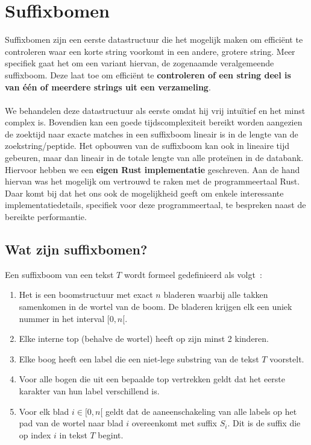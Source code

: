 \chapter{Suffixbomen}\label{ch:suffix-bomen}
Suffixbomen zijn een eerste datastructuur die het mogelijk maken om efficiënt te controleren waar een korte string voorkomt in een andere, grotere string.
Meer specifiek gaat het om een variant hiervan, de zogenaamde veralgemeende suffixboom.
Deze laat toe om efficiënt te \textbf{controleren of een string deel is van één of meerdere strings uit een verzameling}.
\\ \\
We behandelen deze datastructuur als eerste omdat hij vrij intuïtief en het minst complex is.
Bovendien kan een goede tijdscomplexiteit bereikt worden aangezien de zoektijd naar exacte matches in een suffixboom lineair is in de lengte van de zoekstring/peptide.
Het opbouwen van de suffixboom kan ook in lineaire tijd gebeuren, maar dan lineair in de totale lengte van alle proteïnen in de databank.
Hiervoor hebben we een \textbf{eigen Rust implementatie} geschreven.
Aan de hand hiervan was het mogelijk om vertrouwd te raken met de programmeertaal Rust.
Daar komt bij dat het ons ook de mogelijkheid geeft om enkele interessante implementatiedetails, specifiek voor deze programmeertaal, te bespreken naast de bereikte performantie.

\section{Wat zijn suffixbomen?}\label{sec:wat-zijn-suffix-bomen?}
Een suffixboom van een tekst $T$ wordt formeel gedefinieerd als volgt~\cite{CCB_course}:
\begin{enumerate}
    \item Het is een boomstructuur met exact $n$ bladeren waarbij alle takken samenkomen in de wortel van de boom.
    De bladeren krijgen elk een uniek nummer in het interval $[0, n[$.
    \item Elke interne top (behalve de wortel) heeft op zijn minst 2 kinderen.
    \item Elke boog heeft een label die een niet-lege substring van de tekst $T$ voorstelt.
    \item Voor alle bogen die uit een bepaalde top vertrekken geldt dat het eerste karakter van hun label verschillend is.
    \item Voor elk blad $i \in [0, n[$ geldt dat de aaneenschakeling van alle labels op het pad van de wortel naar blad $i$ overeenkomt met suffix $S_i$.
    Dit is de suffix die op index $i$ in tekst $T$ begint.
\end{enumerate}

